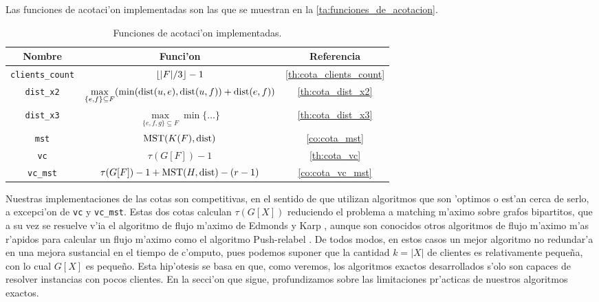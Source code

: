 Las funciones de acotaci'on implementadas son las que se muestran en la \autoref{ta:funciones_de_acotacion}.

\begin{table}[h]
\begin{center}
\begin{tabular}{|c|c|c|}
\hline
\textbf{Nombre} & \textbf{Funci'on} & \textbf{Referencia}\\
\hline
\texttt{clients\_count} & $\left\lfloor |F| / 3 \right\rfloor - 1$ & \autoref{th:cota_clients_count}\\

\texttt{dist\_x2} & $\max\limits_{\{e, f\} \subseteq F}(\min(\textnormal{dist}(u, e), \textnormal{dist}(u, f)) + \textnormal{dist}(e, f))$ & \autoref{th:cota_dist_x2}\\

\texttt{dist\_x3} & $\max\limits_{\{e, f, g\} \subseteq F} \min \{\dots\}$ & \autoref{th:cota_dist_x3}\\

\texttt{mst} & $\textnormal{MST}(K(F), \textnormal{dist})$ & \autoref{co:cota_mst}\\

\texttt{vc} & $\tau(G[F]) - 1$ & \autoref{th:cota_vc}\\

\texttt{vc\_mst} & $\tau(G[F]) - 1 + \textnormal{MST}(H, \textnormal{dist}) - (r - 1)$ & \autoref{co:cota_vc_mst}\\
\hline
\end{tabular}
\caption{Funciones de acotaci'on implementadas.}
\label{ta:funciones_de_acotacion}
\end{center}
\end{table}

\noindent
Nuestras implementaciones de las cotas son competitivas, en el sentido de que utilizan algoritmos que son 'optimos o est'an cerca de serlo, a excepci'on de \texttt{vc} y \texttt{vc\_mst}. Estas dos cotas calculan $\tau(G[X])$ reduciendo el problema a matching m'aximo sobre grafos bipartitos, que a su vez se resuelve v'ia el algoritmo de flujo m'aximo de Edmonds y Karp \cite[p. 664]{Co01}, aunque son conocidos otros algoritmos de flujo m'aximo m'as r'apidos para calcular un flujo m'aximo como el algoritmo Push-relabel \cite[p. 669]{Co01}. De todos modos, en estos casos un mejor algoritmo no redundar'a en una mejora sustancial en el tiempo de c'omputo, pues podemos suponer que la cantidad $k = |X|$ de clientes es relativamente peque\~na, con lo cual $G[X]$ es peque\~no. Esta hip'otesis se basa en que, como veremos, los algoritmos exactos desarrollados s'olo son capaces de resolver instancias con pocos clientes. En la secci'on que sigue, profundizamos sobre las limitaciones pr'acticas de nuestros algoritmos exactos.

